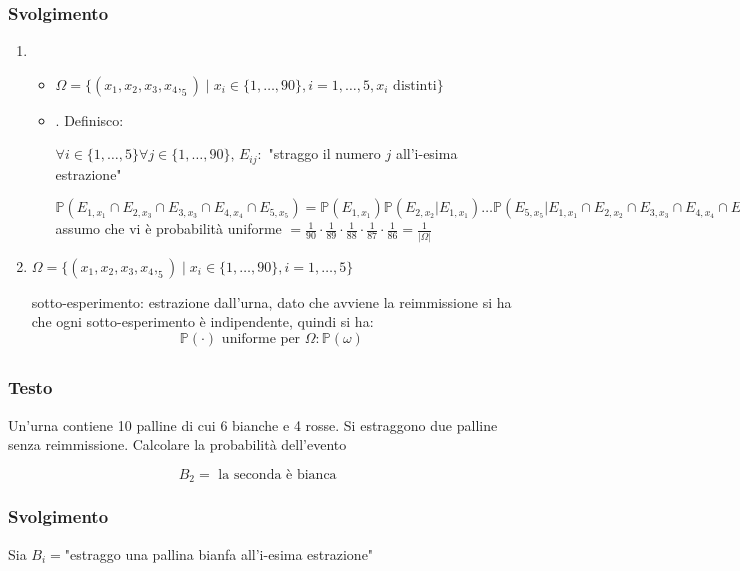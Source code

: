 \subsubsection{Svolgimento}
\begin{enumerate}
    \item \begin{itemize}
        \item  $\Omega = \{(x_1, x_2, x_3, x_4,_5)\mid x_i\in \{1,\dots, 90\}, i=1,\dots,5, x_i \text{ distinti}\}$
        \item .
        Definisco:

        $\forall i\in\{1,\dots, 5\} \forall j\in \{1,\dots, 90\},\, E_{ij}:$ "straggo il numero $j$ all'i-esima estrazione" 

        $\mathbb{P}(E_{1,x_1}\cap E_{2,x_3}\cap E_{3,x_3}\cap E_{4,x_4}\cap E_{5,x_5})= \mathbb{P} (E_{1,x_1}) \mathbb{P}(E_{2,x_2}|E_{1,x_1}) \dots \mathbb{P}(E_{5,x_5} | E_{1,x_1}\cap E_{2,x_2}\cap E_{3,x_3} \cap E_{4,x_4} \cap E_{5,x_5})$ assumo che vi è probabilità uniforme $= \frac{1}{90}\cdot\frac{1}{89}\cdot \frac{1}{88}\cdot\frac{1}{87}\cdot\frac{1}{86} = \frac{1}{|\Omega|}$
    \end{itemize}
    
   

    \item $\Omega = \{(x_1, x_2, x_3, x_4,_5)\mid x_i\in \{1,\dots, 90\}, i=1,\dots,5\}$
    
    sotto-esperimento: estrazione dall'urna, dato che avviene la reimmissione si ha che ogni sotto-esperimento è indipendente, quindi si ha:
    \[
        \mathbb{P}(\cdot) \text{ uniforme per }\Omega: \mathbb{P}(\omega)
    \]
\end{enumerate}

\subsection{}
\subsubsection{Testo}
Un'urna contiene 10 palline di cui 6 bianche e 4 rosse. Si estraggono due palline senza reimmissione. Calcolare la probabilità dell'evento

\[
    B_2 =\text{ la seconda è bianca }
\]

\subsubsection{Svolgimento}
Sia $B_i = $"estraggo una pallina bianfa all'i-esima estrazione"

